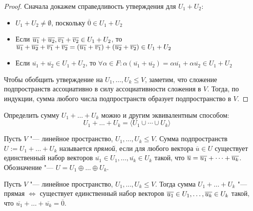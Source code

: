     \begin{proof}
    	Сначала докажем справедливость утверждения для $U_1 + U_2$:
    	\begin{itemize}
    		\item $U_1 + U_2 \ne \emptyset$, поскольку $\overline{0} \in U_1 + U_2$
    		\item Если $\overline{u_1} + \overline{u_2}, \overline{v_1} + \overline{v_2} \hm{\in} U_1 + U_2$, то $\overline{u_1} + \overline{u_2} + \overline{v_1} + \overline{v_2} = (\overline{u_1} + \overline{v_1}) \hm{+} (\overline{u_2} + \overline{v_2}) \in U_1 + U_2$
    		\item Если $\overline{u_1} + \overline{u_2} \in U_1 + U_2$, то $\forall \alpha \in F: \alpha(\overline{u_1} + \overline{u_2}) = \alpha\overline{u_1} + \alpha\overline{u_2} \in U_1 + U_2$
    	\end{itemize}
    	
    	Чтобы обобщить утверждение на $U_1, \dots, U_k \le V$, заметим, что сложение подпространств ассоциативно в силу ассоциативности сложения в $V$. Тогда, по индукции, сумма любого числа подпространств образует подпространство в $V$.
    \end{proof}
    
    \begin{note}
    	Определить сумму $U_1 + \dots + U_k$ можно и другим эквивалентным способом:
    	\[U_1 + \dots + U_k = \langle U_1\cup\dotsb\cup U_k\rangle\]
    \end{note}
    
    \begin{definition}
    	Пусть $V$ "--- линейное пространство, $U_1, \dots, U_k \le V$. Сумма подпространств $U := U_1 + \dots + U_k$ называется \textit{прямой}, если для любого вектора $\overline{u} \in U$ существует единственный набор векторов $\overline{u_1} \in U_1, \dots, \overline{u_k} \in U_k$ такой, что $\overline{u} \hm{=} \overline{u_1} + \dots + \overline{u_k}$. Обозначение "--- $U = U_1 \oplus \dots \oplus U_k$.
    \end{definition}
    
    \begin{proposition}
    	Пусть $V$ "--- линейное пространство, $U_1, \dots, U_k \le V$. Тогда сумма $U_1 + \dots + U_k$ "--- прямая $\Leftrightarrow$ существует единственный набор векторов $\overline{u_1} \in U_1, \dots, \overline{u_k} \hm{\in} U_k$ такой, что $\overline{u_1} + \dots + \overline{u_k} = \overline{0}$.
    \end{proposition}
    
